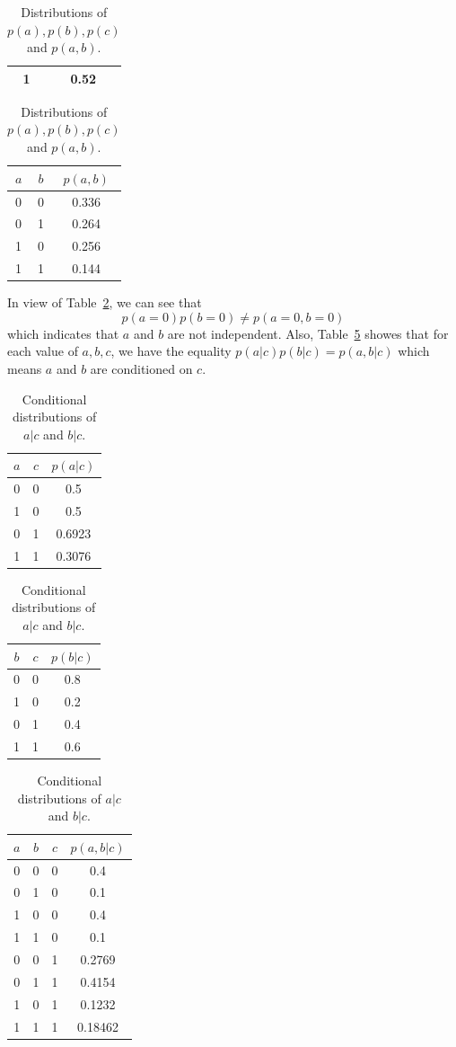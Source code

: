 \documentclass[12pt, fullpage,letterpaper]{article}
\begin{document}
\begin{enumerate}
{\begin{table}
\begin{tabular}{||c|c||}
		1 & 0.52\\
	    \hline
	\end{tabular}
	\quad{}\quad  
	\begin{tabular}{||c|c|c||}
		\hline
		$a$ & $b$ & $p(a,b)$\\
		\hline
		0 & 0 & 0.336\\
		0 & 1 & 0.264\\
		1 & 0 & 0.256\\
		1 & 1 & 0.144\\
	    \hline
	\end{tabular}
\caption{Distributions of $p(a),p(b), p(c)$ and $p(a,b)$.} \label{tb:joint}
\end{table}
In view of Table~\ref{tb:joint}, we can see that 
$$p(a=0)p(b=0) \neq p(a=0,b=0)$$ which indicates that $a$ and $b$ are not independent. 
Also, Table~\ref{tb:abgivenc} showes that for each value of $a,b,c$, we have the equality $p(a|c)p(b|c) = p(a,b|c)$ which means $a$ and $b$ are conditioned on $c$.

\begin{table}
	\centering
	\begin{tabular}{||c|c|c||}
		\hline
		$a$ & $c$ & $p(a|c)$\\
		\hline
		0 & 0 & 0.5\\
		1 & 0 & 0.5\\
		\hline
		\hline
		0 & 1 & 0.6923\\
		1 & 1 & 0.3076\\
	    \hline
	\end{tabular}
	\quad{}\quad  
		\begin{tabular}{||c|c|c||}
		\hline
		$b$ & $c$ & $p(b|c)$\\
		\hline
		\hline
		0 & 0 & 0.8\\
		1 & 0 & 0.2\\
		\hline
		0 & 1 & 0.4\\
		1 & 1 & 0.6\\
	    \hline
	\end{tabular}
	\quad{}\quad  
		\begin{tabular}{||c|c||c||c||}
		\hline
		$a$ & $b$ & $c$ & $p(a,b|c)$\\
		\hline
		\hline
		0 & 0 & 0 & 0.4\\
		0 & 1 & 0 & 0.1\\
		1 & 0 & 0 & 0.4\\
		1 & 1 & 0 & 0.1\\
		\hline
		0 & 0 & 1 & 0.2769\\
		0 & 1 & 1 & 0.4154\\
		1 & 0 & 1 & 0.1232\\
		1 & 1 & 1 & 0.18462\\
	    \hline
	\end{tabular}
\caption{Conditional distributions of $a|c$ and $b|c$.} \label{tb:abgivenc}
\end{table}
}


\end{enumerate}
\end{document}
